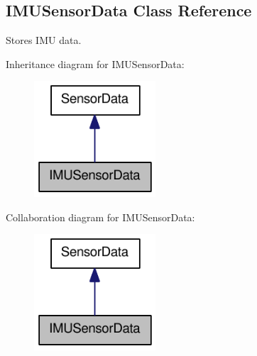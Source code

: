 \hypertarget{classOpenRAVE_1_1SensorBase_1_1IMUSensorData}{
\subsection{IMUSensorData Class Reference}
\label{classOpenRAVE_1_1SensorBase_1_1IMUSensorData}
}


Stores IMU data.  




Inheritance diagram for IMUSensorData:\nopagebreak
\begin{figure}[H]
\begin{center}
\leavevmode
\includegraphics[width=128pt]{classOpenRAVE_1_1SensorBase_1_1IMUSensorData__inherit__graph}
\end{center}
\end{figure}


Collaboration diagram for IMUSensorData:\nopagebreak
\begin{figure}[H]
\begin{center}
\leavevmode
\includegraphics[width=128pt]{classOpenRAVE_1_1SensorBase_1_1IMUSensorData__coll__graph}
\end{center}
\end{figure}
